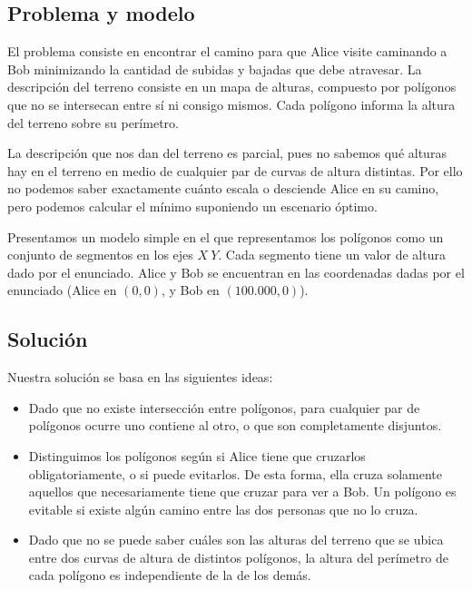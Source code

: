 \subsection*{Problema y modelo}

El problema consiste en encontrar el camino para que Alice visite caminando
a Bob minimizando la cantidad de subidas y bajadas que debe atravesar. La
descripción del terreno consiste en un mapa de alturas, compuesto por
polígonos que no se intersecan entre sí ni consigo mismos. Cada polígono
informa la altura del terreno sobre su perímetro.

La descripción que nos dan del terreno es parcial, pues no sabemos qué
alturas hay en el terreno en medio de cualquier par de curvas de altura
distintas. Por ello no podemos saber exactamente cuánto escala o desciende
Alice en su camino, pero podemos calcular el mínimo suponiendo un escenario
óptimo.

Presentamos un modelo simple en el que representamos los polígonos como
un conjunto de segmentos en los ejes $X\ Y$. Cada segmento tiene un valor de
altura dado por el enunciado. Alice y Bob se encuentran en las coordenadas
dadas por el enunciado (Alice en $(0,0)$, y Bob en $(100.000,0)$).

\subsection*{Solución}

Nuestra solución se basa en las siguientes ideas:

\begin{itemize}
\item Dado que no existe intersección entre polígonos, para cualquier par de
polígonos ocurre uno contiene al otro, o que son completamente disjuntos.

\item Distinguimos los polígonos según si Alice tiene que cruzarlos
obligatoriamente, o si puede evitarlos. De esta forma, ella cruza solamente
aquellos que necesariamente tiene que cruzar para ver a Bob. Un polígono es
evitable si existe algún camino entre las dos personas que no lo cruza.

\item Dado que no se puede saber cuáles son las alturas del terreno que
se ubica entre dos curvas de altura de distintos polígonos, la altura del
perímetro de cada polígono es independiente de la de los demás.
\end{itemize}

